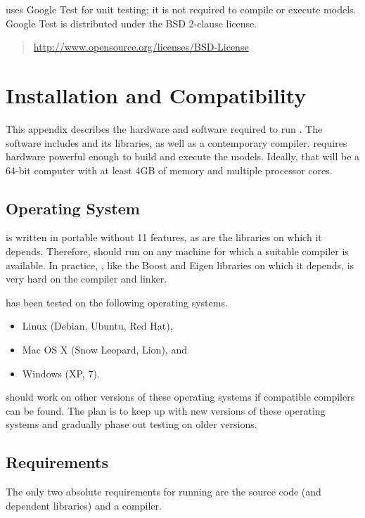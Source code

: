 \Stan uses Google Test for unit testing; it is not required to compile
or execute models.  Google Test is distributed under the BSD 2-clause
license.
%
\begin{quote}
\url{http://www.opensource.org/licenses/BSD-License}
\end{quote}


\chapter{Installation and Compatibility}\label{install.appendix}

\noindent
This appendix describes the hardware and software required to run
\Stan.  The software includes \Stan and its libraries, as well as a
contemporary \Cpp compiler.  \Stan requires hardware powerful enough
to build and execute the models.  Ideally, that will be a 64-bit
computer with at least 4GB of memory and multiple processor cores.

\section{Operating System}

\Stan is written in portable \Cpp without {\Cpp}11 features, as are the
libraries on which it depends.  Therefore, \Stan should run on any machine
for which a suitable \Cpp compiler is available.  In practice, \Stan,
like the Boost and Eigen libraries on which it depends, is very hard
on the compiler and linker.

\Stan has been tested on the following operating systems.
%
\begin{itemize}
\item Linux (Debian, Ubuntu, Red Hat), 
\item Mac OS X (Snow Leopard, Lion), and
\item Windows (XP, 7).
\end{itemize}
%
\Stan should work on other versions of these operating systems if
compatible \Cpp compilers can be found.  The plan is to keep up with
new versions of these operating systems and gradually phase out
testing on older versions.


\section{Requirements}

The only two absolute requirements for running \Stan are the
\Stan source code (and dependent libraries) and a \Cpp compiler.

